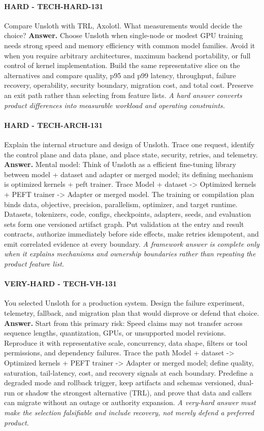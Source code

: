\paragraph{HARD - TECH-HARD-131} Compare Unsloth with TRL, Axolotl. What measurements would decide the choice?
\textbf{Answer.} Choose Unsloth when single-node or modest GPU training needs strong speed and memory efficiency with common model families. Avoid it when you require arbitrary architectures, maximum backend portability, or full control of kernel implementation. Build the same representative slice on the alternatives and compare quality, p95 and p99 latency, throughput, failure recovery, operability, security boundary, migration cost, and total cost. Preserve an exit path rather than selecting from feature lists.
\textit{A hard answer converts product differences into measurable workload and operating constraints.}
\paragraph{HARD - TECH-ARCH-131} Explain the internal structure and design of Unsloth. Trace one request, identify the control plane and data plane, and place state, security, retries, and telemetry.
\textbf{Answer.} Mental model: Think of Unsloth as a efficient fine-tuning library between model + dataset and adapter or merged model; its defining mechanism is optimized kernels + peft trainer. Trace Model + dataset -> Optimized kernels + PEFT trainer -> Adapter or merged model. The training or compilation plan binds data, objective, precision, parallelism, optimizer, and target runtime. Datasets, tokenizers, code, configs, checkpoints, adapters, seeds, and evaluation sets form one versioned artifact graph. Put validation at the entry and result contracts, authorize immediately before side effects, make retries idempotent, and emit correlated evidence at every boundary.
\textit{A framework answer is complete only when it explains mechanisms and ownership boundaries rather than repeating the product feature list.}
\paragraph{VERY-HARD - TECH-VH-131} You selected Unsloth for a production system. Design the failure experiment, telemetry, fallback, and migration plan that would disprove or defend that choice.
\textbf{Answer.} Start from this primary risk: Speed claims may not transfer across sequence lengths, quantization, GPUs, or unsupported model revisions. Reproduce it with representative scale, concurrency, data shape, filters or tool permissions, and dependency failures. Trace the path Model + dataset -> Optimized kernels + PEFT trainer -> Adapter or merged model; define quality, saturation, tail-latency, cost, and recovery signals at each boundary. Predefine a degraded mode and rollback trigger, keep artifacts and schemas versioned, dual-run or shadow the strongest alternative (TRL), and prove that data and callers can migrate without an outage or authority expansion.
\textit{A very-hard answer must make the selection falsifiable and include recovery, not merely defend a preferred product.}
